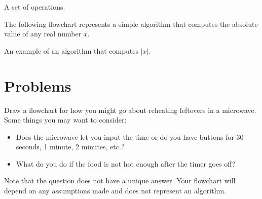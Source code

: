 \documentclass{ximera}
\begin{document}
\begin{center}
\end{center}
\begin{center}
	A set of operations.
\end{center}

The following flowchart represents a simple algorithm that computes the absolute value of any real number $x$.

\begin{center}
\end{center}
\begin{center}
	An example of an algorithm that computes $|x|$.
\end{center}

\section{Problems}

\begin{question}
	Draw a flowchart for how you might go about reheating leftovers in a microwave. Some things you may want to consider:
	\begin{itemize}
		\item Does the microwave let you input the time or do you have buttons for 30 seconds, 1 minute, 2 minutes, etc.?
		\item What do you do if the food is not hot enough after the timer goes off?
	\end{itemize}
	Note that the question does not have a unique answer. Your flowchart will depend on any assumptions made and does not represent an algorithm.
\end{question}
\end{document}
